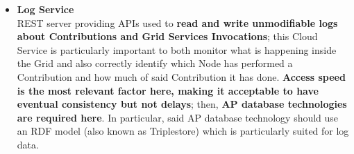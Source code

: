 \begin{itemize}
    \item \textbf{Log Service}\\
    REST server providing APIs used to \textbf{read and write unmodifiable logs about Contributions and Grid Services Invocations}; this Cloud Service is particularly important to both monitor what is happening inside the Grid and also correctly identify which Node has performed a Contribution and how much of said Contribution it has done. \textbf{Access speed is the most relevant factor here, making it acceptable to have eventual consistency but not delays}; then, \textbf{AP database technologies are required here}. In particular, said AP database technology should use an RDF model (also known as Triplestore) which is particularly suited for log data.
\end{itemize}

